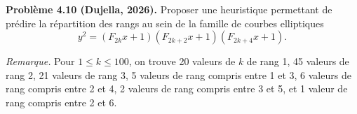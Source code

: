 \textbf{Problème 4.10 (Dujella, 2026).} Proposer une heuristique permettant de prédire la répartition des rangs au sein de la famille de courbes elliptiques
\[
y^2=(F_{2k}x+1)(F_{2k+2}x+1)(F_{2k+4}x+1).
\]

\medskip

\textit{Remarque.} Pour $1 \leqslant k \leqslant 100$, on trouve 20 valeurs de $k$ de rang 1, 45 valeurs de rang 2, 21 valeurs de rang 3, 5 valeurs de rang compris entre 1 et 3, 6 valeurs de rang compris entre 2 et 4, 2 valeurs de rang compris entre 3 et 5, et 1 valeur de rang compris entre 2 et 6.
